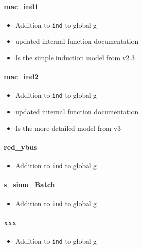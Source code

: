 \documentclass[12pt]{article}
\begin{document}
\paragraph{mac\_ind1}
	\begin{itemize}
		\item Addition to \verb|ind| to global g
		\item updated internal function documentation
		\item Is the simple induction model from v2.3
	\end{itemize}

\paragraph{mac\_ind2}
	\begin{itemize}
		\item Addition to \verb|ind| to global g
		\item updated internal function documentation
		\item Is the more detailed model from v3
	\end{itemize}

\paragraph{red\_ybus}
	\begin{itemize}
		\item Addition to \verb|ind| to global g
	\end{itemize}


\paragraph{s\_simu\_Batch}
	\begin{itemize}
		\item Addition to \verb|ind| to global g
	\end{itemize}


\paragraph{xxx}
	\begin{itemize}
		\item Addition to \verb|ind| to global g
	\end{itemize}
\end{document}
